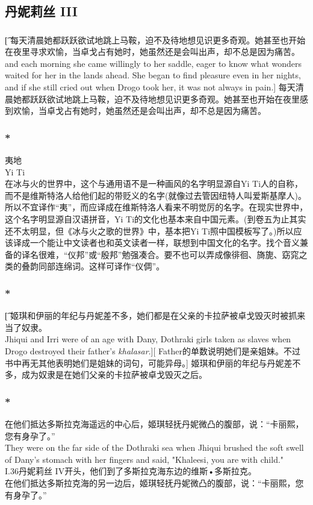 \documentclass[12pt,a4paper]{article}
\newcommand{\h}[1]{{\color{red}#1}\\}
\newcommand{\la}[1]{{\color{blue}#1}\\}
\begin{document}
		
\subsection{丹妮莉丝 III}
\subsubsection{}\t[
	每天清晨她都跃跃欲试地跳上马鞍，迫不及待地想见识更多奇观。她甚至也开始在夜里寻求欢愉，当卓戈占有她时，她虽然还是会叫出声，却不总是因为痛苦。\\
	and each morning she came willingly to her saddle, eager to know what wonders waited for her in the lands ahead. She began to find pleasure even in her nights, and if she still cried out when Drogo took her, it was not always in pain.]
	每天清晨她都跃跃欲试地跳上马鞍，迫不及待地想见识更多奇观。她甚至也开始在夜里感到欢愉，当卓戈占有她时，她虽然还是会叫出声，却不总是因为痛苦。
	
\subsubsection{\color{red}*}\la{
	夷地\\
	Yi Ti}\h{
	在冰与火的世界中，这个与通用语不是一种画风的名字明显源自Yi Ti人的自称，而不是维斯特洛人给他们起的带贬义的名字(就像过去管因纽特人叫爱斯基摩人)。所以不宜译作“夷”，而应译成在维斯特洛人看来不明觉厉的名字。在现实世界中，这个名字明显源自汉语拼音，Yi Ti的文化也基本来自中国元素。(到卷五为止其实还不太明显，但《冰与火之歌的世界》中，基本把Yi Ti照中国模板写了。)所以应该译成一个能让中文读者也和英文读者一样，联想到中国文化的名字。找个音义兼备的译名很难，“仪邦”或“殷邦”勉强凑合。要不也可以弄成像徘徊、旖旎、窈窕之类的叠韵同部连绵词。这样可译作“仪倜”。}
	
\subsubsection{\color{red}*}\t[	
	姬琪和伊丽的年纪与丹妮差不多，她们都是在父亲的卡拉萨被卓戈毁灭时被抓来当了奴隶。\\
	Jhiqui and Irri were of an age with Dany, Dothraki girls taken as slaves when Drogo destroyed their father's \emph{khalasar}.][
	Father的单数说明她们是亲姐妹。不过书中再无其他表明她们是姐妹的词句，可能异母。]
	姬琪和伊丽的年纪与丹妮差不多，成为奴隶是在她们父亲的卡拉萨被卓戈毁灭之后。
	
\subsubsection{\color{red}*}\la{
	在他们抵达多斯拉克海遥远的中心后，姬琪轻抚丹妮微凸的腹部，说：“卡丽熙，您有身孕了。”\\
	They were on the far side of the Dothraki sea when Jhiqui brushed the soft swell of Dany's stomach with her fingers and said, "Khaleesi, you are with child."}\h{
	I.36丹妮莉丝 IV开头，他们到了多斯拉克海东边的维斯•多斯拉克。}
	在他们抵达多斯拉克海的另一边后，姬琪轻抚丹妮微凸的腹部，说：“卡丽熙，您有身孕了。”
	
\end{document}
